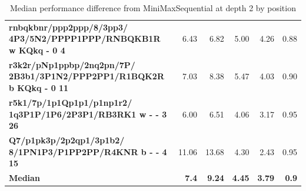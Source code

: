 \begin{table}[H]
{\begin{tabular}{|p{8cm}|*{5}{r|}}
\rowcolor[HTML]{FFFFFF}
\textbf{rnbqkbnr/ppp2ppp/8/3pp3/ 4P3/5N2/PPPP1PPP/RNBQKB1R w KQkq - 0 4}               & 6.43 & 6.82 & 5.00 & 4.26 & 0.88 \\

\rowcolor[HTML]{EFEFEF}
\textbf{r3k2r/pNp1ppbp/2nq2pn/7P/ 2B3b1/3P1N2/PPP2PP1/R1BQK2R b KQkq - 0 11}               & 7.03 & 8.38 & 5.47 & 4.03 & 0.90 \\

\rowcolor[HTML]{FFFFFF}
\textbf{r5k1/7p/1p1Qp1p1/p1np1r2/ 1q3P1P/1P6/2P3P1/RB3RK1 w - - 3 26}               & 6.00 & 6.51 & 4.06 & 3.17 & 0.95 \\

\rowcolor[HTML]{EFEFEF}
\textbf{Q7/p1pk3p/2p2qp1/3p1b2/ 8/1PN1P3/P1PP2PP/R4KNR b - - 4 15}               & 11.06 & 13.68 & 4.30 & 2.43 & 0.95 \\
\hline
\hline
\rowcolor[HTML]{FFFFFF}
\textbf{Median}               & \textbf{7.4} & \textbf{9.24} & \textbf{4.45} & \textbf{3.79} & \textbf{0.9} \\

            \hline
        \end{tabular}%
    }
    \caption{Median performance difference from MiniMaxSequential at depth 2 by position}
    \label{tab:median-performance-difference-from-minimaxsequential-at-depth-2-by-position}
\end{table}
